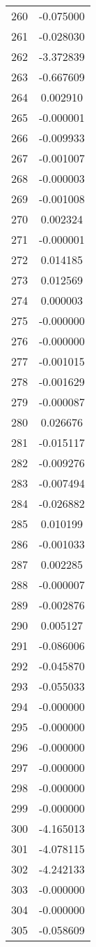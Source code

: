 \documentclass[12pt]{article}
\begin{document}
\begin{longtable}{@{}cc@{}}
260 & -0.075000 \\
261 & -0.028030 \\
262 & -3.372839 \\
263 & -0.667609 \\
264 & 0.002910 \\
265 & -0.000001 \\
266 & -0.009933 \\
267 & -0.001007 \\
268 & -0.000003 \\
269 & -0.001008 \\
270 & 0.002324 \\
271 & -0.000001 \\
272 & 0.014185 \\
273 & 0.012569 \\
274 & 0.000003 \\
275 & -0.000000 \\
276 & -0.000000 \\
277 & -0.001015 \\
278 & -0.001629 \\
279 & -0.000087 \\
280 & 0.026676 \\
281 & -0.015117 \\
282 & -0.009276 \\
283 & -0.007494 \\
284 & -0.026882 \\
285 & 0.010199 \\
286 & -0.001033 \\
287 & 0.002285 \\
288 & -0.000007 \\
289 & -0.002876 \\
290 & 0.005127 \\
291 & -0.086006 \\
292 & -0.045870 \\
293 & -0.055033 \\
294 & -0.000000 \\
295 & -0.000000 \\
296 & -0.000000 \\
297 & -0.000000 \\
298 & -0.000000 \\
299 & -0.000000 \\
300 & -4.165013 \\
301 & -4.078115 \\
302 & -4.242133 \\
303 & -0.000000 \\
304 & -0.000000 \\
305 & -0.058609 \\

\end{longtable}
\end{document}
